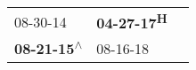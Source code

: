\begin{supertabular}{lll}
                  08-30-14\textsuperscript{} &  \textbf{04-27-17\textsuperscript{H}} \\
 \textbf{08-21-15\textsuperscript{$\wedge$}} &            08-16-18\textsuperscript{} \\
\end{supertabular}
